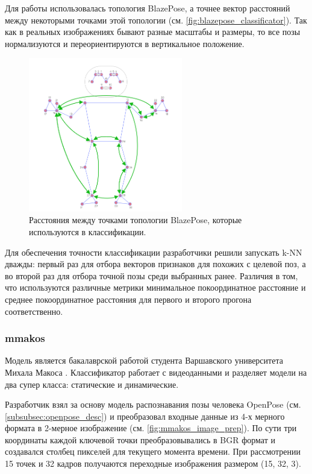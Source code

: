Для работы использовалась топология BlazePose, а точнее вектор расстояний между некоторыми точками этой топологии (см. \autoref{fig:blazepose_classificator}). Так как в реальных изображениях бывают разные масштабы и размеры, то все позы нормализуются и переориентируются в вертикальное положение.

\begin{figure}[h]
	\centering
	\includegraphics[width=0.6\textwidth]{./images/Classificators/BlazePose}
	\caption{Расстояния между точками топологии BlazePose, которые используются в классификации. \cite{mediapipe_cls}}
	\label{fig:blazepose_classificator}
\end{figure}

Для обеспечения точности классификации разработчики решили запускать k-NN дважды: первый раз для отбора векторов признаков для похожих с целевой поз, а во второй раз для отбора точной позы среди выбранных ранее. Различия в том, что используются различные метрики минимальное покоординатное расстояние и среднее покоординатное расстояния для первого и второго прогона соответственно.



\subsubsection{mmakos}
\label{subsubsec:mmakos_desc}

Модель является бакалаврской работой студента Варшавского университета Михала Макоса \cite{mmakos}. Классификатор работает с видеоданными и разделяет модели на два супер класса: статические и динамические.

Разработчик взял за основу модель распознавания позы человека OpenPose (см. \autoref{subsubsec:openpose_desc}) и преобразовал входные данные из 4-х мерного формата в 2-мерное изображение (см. \autoref{fig:mmakos_image_prep}). По сути три координаты каждой ключевой точки преобразовывались в BGR формат и создавался столбец пикселей для текущего момента времени. При рассмотрении 15 точек и 32 кадров получаются переходные изображения размером (15, 32, 3).

